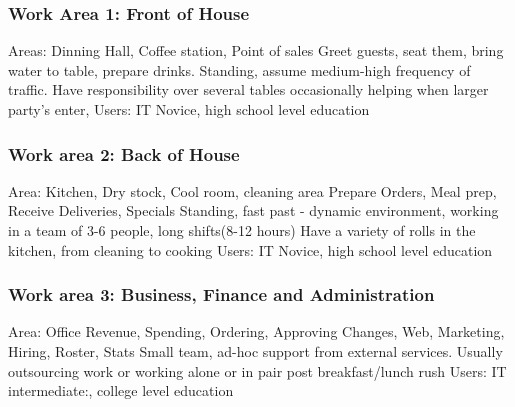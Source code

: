 \documentclass{article}
\begin{document}
\subsubsection{Work Area 1: Front of House}
Areas: Dinning Hall, Coffee station, Point of sales
Greet guests, seat them, bring water to table, prepare drinks. 
Standing, assume medium-high frequency of traffic.
Have responsibility over several tables occasionally helping when larger party's enter,
Users: IT Novice, high school level education

\subsubsection{Work area 2: Back of House}
Area: Kitchen, Dry stock, Cool room, cleaning area
Prepare Orders, Meal prep, Receive Deliveries, Specials
Standing, fast past - dynamic environment, working in a team of 3-6 people, long shifts(8-12 hours)
Have a variety of rolls in the kitchen, from cleaning to cooking
Users: IT Novice, high school level education

\subsubsection{Work area 3: Business, Finance and Administration}
Area: Office
Revenue, Spending, Ordering, Approving Changes, Web, Marketing, Hiring, Roster, Stats
Small team, ad-hoc support from external services.
Usually outsourcing work or working alone or in pair post breakfast/lunch rush
Users: IT intermediate:, college level education
\end{document}
